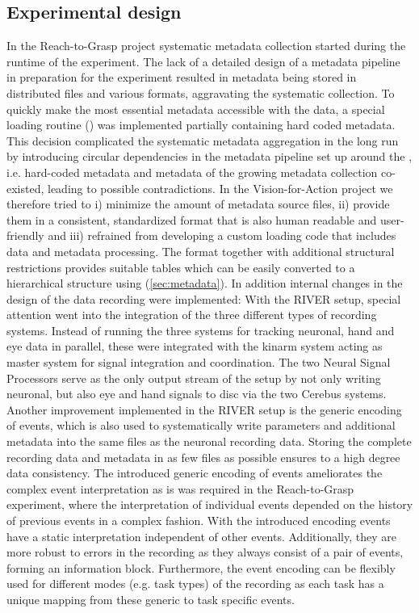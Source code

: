 \subsection{Experimental design}
In the Reach-to-Grasp project systematic metadata collection started during the runtime of the experiment. The lack of a detailed design of a metadata pipeline in preparation for the experiment resulted in metadata being stored in distributed files and various formats, aggravating the systematic collection. To quickly make the most essential metadata accessible with the data, a special loading routine () was implemented partially containing hard coded metadata. This decision complicated the systematic metadata aggregation in the long run by introducing circular dependencies in the metadata pipeline set up around the , i.e. hard-coded metadata and metadata of the growing metadata collection co-existed, leading to possible contradictions.
In the Vision-for-Action project we therefore tried to i) minimize the amount of metadata source files, ii) provide them in a consistent, standardized format that is also human readable and user-friendly and iii) refrained from developing a custom loading code that includes data and metadata processing. The  format together with additional structural restrictions provides suitable tables which can be easily converted to a hierarchical  structure using  (\cref{sec:metadata}).
In addition internal changes in the design of the data recording were implemented: With the RIVER setup, special attention went into the integration of the three different types of recording systems. Instead of running the three systems for tracking neuronal, hand and eye data in parallel, these were integrated with the kinarm system acting as master system for signal integration and coordination. The two Neural Signal Processors serve as the only output stream of the setup by not only writing neuronal, but also eye and hand signals to disc via the two Cerebus systems.
Another improvement implemented in the RIVER setup is the generic encoding of events, which is also used to systematically write parameters and additional metadata into the same files as the neuronal recording data. Storing the complete recording data and metadata in as few files as possible ensures to a high degree data consistency. The introduced generic encoding of events ameliorates the complex event interpretation as is was required in the Reach-to-Grasp experiment, where the interpretation of individual events depended on the history of previous events in a complex fashion. With the introduced encoding events have a static interpretation independent of other events. Additionally, they are more robust to errors in the recording as they always consist of a pair of events, forming an information block. Furthermore, the event encoding can be flexibly used for different modes (e.g. task types) of the recording as each task has a unique mapping from these generic to task specific events.

